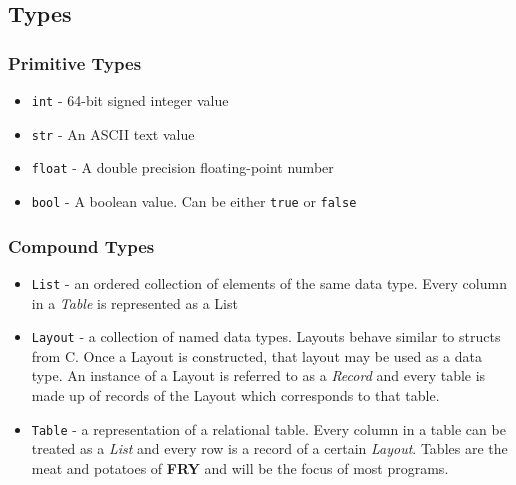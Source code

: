\documentclass{article}
\begin{document}
\subsection{Types}
\subsubsection{Primitive Types}
\label{sec:prims}
\begin{itemize}
\item \texttt{int} - 64-bit signed integer value

\item \texttt{str} - An ASCII text value

\item \texttt{float} - A double precision floating-point number

\item \texttt{bool} - A boolean value. Can be either \texttt{true} or \texttt{false}

\end{itemize}

\subsubsection{Compound Types}

\begin{itemize} 

\item \texttt{List} - an ordered collection of elements of the same data type. Every column in a \emph{Table} is represented as a List

\item \texttt{Layout} - a collection of named data types. Layouts behave similar to structs from C. Once a Layout is constructed, that layout may be used as a data type.  An instance of a Layout is referred to as a \emph{Record} and every table is made up of records of the Layout which corresponds to that table.

\item \texttt{Table} - a representation of a relational table. Every column in a table can be treated as a \emph{List} and every row is a record of a certain \emph{Layout}. Tables are the meat and potatoes of \textbf{FRY} and will be the focus of most programs.

\end{itemize}

\end{document}
